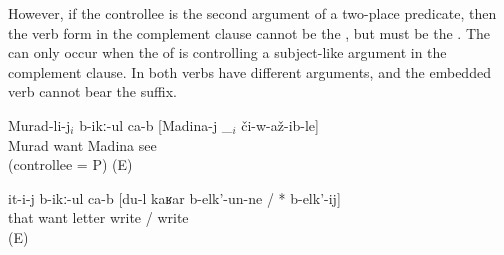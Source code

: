 However, if the controllee is the second argument of a two-place predicate, then the verb form in the complement clause cannot be the , but must be the  . The  can only occur when the  of  is controlling a subject-like argument in the complement clause. In  both verbs have different arguments, and the embedded verb cannot bear the  suffix.
%
\begin{exe}
	\ex	\label{ex:Murad, Madina, letter@45}
	\begin{xlist}
		\ex	\label{ex:Murad wants Madina to see him@45a}
		\gll	Murad-li-j$_{i}$	b-ikː-ul ca-b	[Madina-j	\_$_{i}$	či-w-až-ib-le]\\
			Murad	want 	 Madina		see\\
		\glt	{} (controllee = P) (E)

		\ex	\label{ex:He wants that I write the letter@45b}
		\gll	it-i-j	b-ikː-ul ca-b	[du-l	kaʁar 	b-elk'-un-ne	/ 	{*}	b-elk'-ij]\\
			that	want 		letter	write	/	{} write\\
		\glt	{} (E)
	\end{xlist}
\end{exe}

